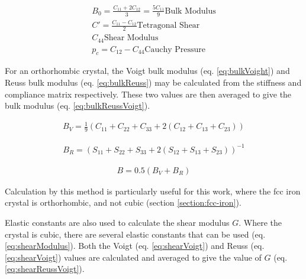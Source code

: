 \begin{equation}
\begin{split}
B_{0} = \frac{C_{11} + 2 C_{12}}{3} = \frac{5 C_{11}}{9} \text{Bulk Modulus} \\
C' = \frac{C_{11} - C_{12}}{2} \text{Tetragonal Shear} \\
C_{44} \text{Shear Modulus} \\
p_{c} = C_{12} - C_{44}  \text{Cauchy Pressure} 
\end{split}
\label{eq:cubicProperties}
\end{equation}


For an orthorhombic crystal, the Voigt bulk modulus (eq. \ref{eq:bulkVoight}) and Reuss bulk modulus (eq. \ref{eq:bulkReuss}) may be calculated from the stiffness and compliance matrix respectively.  These two values are then averaged to give the bulk modulus (eq. \ref{eq:bulkReussVoigt})\cite{dftrfkj}.

\begin{equation}
\begin{split}
B_{V} = \frac{1}{9} \left( C_{11} + C_{22} + C_{33} + 2(C_{12} + C_{13} + C_{23}) \right)
\end{split}
\label{eq:bulkVoight}
\end{equation}

\begin{equation}
\begin{split}
B_{R} = \left( S_{11} + S_{22} + S_{33} + 2(S_{12} + S_{13} + S_{23}) \right)^{-1}
\end{split}
\label{eq:bulkReuss}
\end{equation}

\begin{equation}
\begin{split}
B = 0.5(B_V + B_R)
\end{split}
\label{eq:bulkReussVoigt}
\end{equation}

Calculation by this method is particularly useful for this work, where the \acrshort{fcc} iron crystal is orthorhombic, and not cubic (section \ref{section:fcc-iron}).

Elastic constants are also used to calculate the shear modulus $G$.  Where the crystal is cubic, there are several elastic constants that can be used (eq. \ref{eq:shearModulus})\cite{dftrfkj}.  Both the Voigt (eq. \ref{eq:shearVoigt}) and Reuss (eq. \ref{eq:shearVoigt}) values are calculated and averaged to give the value of $G$ (eq. \ref{eq:shearReussVoigt}).  

